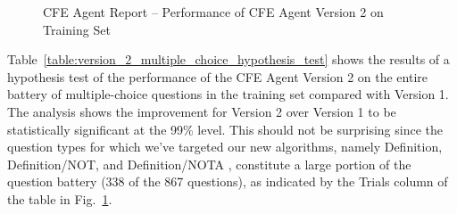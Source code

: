 
\begin{figure}
\centering
\vspace{0.25in}
\caption{CFE Agent Report -- Performance of CFE Agent Version 2 on Training Set}
\label{fig:version_2_training_set_performance}
\end{figure}

Table~\ref{table:version_2_multiple_choice_hypothesis_test} shows the results of a hypothesis test of the performance of the CFE Agent Version 2 on the entire battery of multiple-choice questions in the training set compared with Version 1.  The analysis shows the improvement for Version 2 over Version 1 to be statistically significant at the 99\% level.  This should not be surprising since the question types for which we've targeted our new algorithms, namely Definition, Definition/NOT, and Definition/NOTA , constitute a large portion of the question battery (338 of the 867 questions), as indicated by the Trials column of the table in Fig.~\ref{fig:version_2_training_set_performance}.


